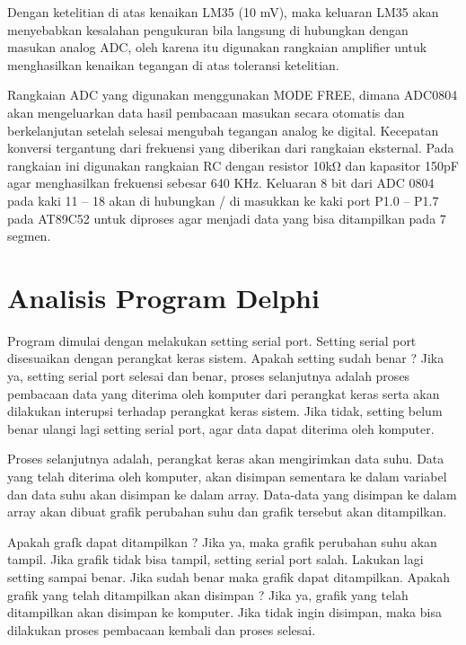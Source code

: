 \documentclass{jtetiproposalskripsi}
\begin{document}
Dengan ketelitian di atas kenaikan LM35 (10 mV), maka keluaran LM35 akan menyebabkan kesalahan pengukuran bila langsung di hubungkan dengan masukan analog ADC, oleh karena itu digunakan rangkaian amplifier untuk menghasilkan kenaikan tegangan di atas toleransi ketelitian.




Rangkaian ADC yang digunakan menggunakan MODE FREE, dimana ADC0804 akan mengeluarkan data hasil pembacaan masukan  secara otomatis dan berkelanjutan setelah selesai mengubah tegangan analog ke digital.
Kecepatan konversi tergantung dari frekuensi yang diberikan dari rangkaian eksternal. Pada rangkaian ini digunakan rangkaian RC dengan resistor 10kΩ dan kapasitor 150pF agar menghasilkan frekuensi sebesar 640 KHz. 
Keluaran 8 bit dari ADC 0804 pada kaki 11 – 18 akan di hubungkan / di masukkan ke kaki port P1.0 – P1.7 pada AT89C52 untuk diproses agar menjadi data yang bisa ditampilkan pada 7 segmen.  



\section{Analisis Program Delphi}
Program dimulai dengan melakukan setting serial port. Setting serial port disesuaikan dengan perangkat keras sistem. Apakah setting sudah benar ? Jika ya, setting serial port selesai dan benar, proses selanjutnya adalah proses pembacaan data yang diterima oleh komputer dari perangkat keras serta akan dilakukan interupsi terhadap perangkat keras sistem. Jika tidak, setting belum benar ulangi lagi setting serial port, agar data dapat diterima oleh komputer. 




Proses selanjutnya adalah, perangkat keras akan mengirimkan data suhu. Data yang telah diterima oleh komputer, akan disimpan sementara ke dalam variabel dan data suhu akan disimpan ke dalam array. Data-data yang disimpan ke dalam array akan dibuat grafik perubahan suhu dan grafik tersebut akan ditampilkan.




Apakah grafk dapat ditampilkan ? Jika ya, maka grafik perubahan suhu akan tampil. Jika grafik tidak bisa tampil, setting serial port salah. Lakukan lagi setting sampai benar. Jika sudah benar maka grafik dapat ditampilkan. Apakah grafik yang telah ditampilkan akan disimpan ? Jika ya, grafik yang telah ditampilkan akan disimpan ke komputer. Jika tidak ingin disimpan, maka bisa dilakukan proses pembacaan kembali dan proses selesai.
\end{document}
